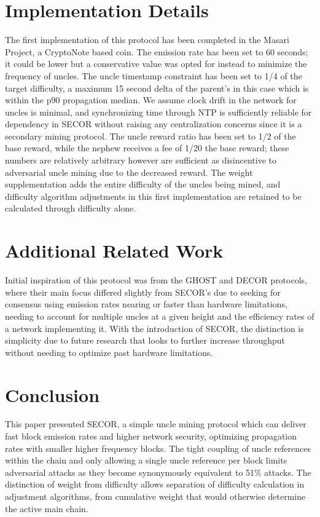 \documentclass{article}
\begin{document}
\section{Implementation Details}
The first implementation of this protocol has been completed in the Masari Project, a CryptoNote based coin. The emission rate has been set to 60 seconds; it could be lower but a conservative value was opted for instead to minimize the frequency of uncles. The uncle timestamp constraint has been set to 1/4 of the target difficulty, a maximum 15 second delta of the parent's in this case which is within the p90 propagation median. We assume clock drift in the network for uncles is minimal, and synchronizing time through NTP is sufficiently reliable for dependency in SECOR without raising any centralization concerns since it is a secondary mining protocol. The uncle reward ratio has been set to 1/2 of the base reward, while the nephew receives a fee of 1/20 the base reward; these numbers are relatively arbitrary however are sufficient as disincentive to adversarial uncle mining due to the decreased reward. The weight supplementation adds the entire difficulty of the uncles being mined, and difficulty algorithm adjustments in this first implementation are retained to be calculated through difficulty alone.

\section{Additional Related Work}
Initial inspiration of this protocol was from the GHOST and DECOR protocols, where their main focus differed slightly from SECOR's due to seeking for consensus using emission rates nearing or faster than hardware limitations, needing to account for multiple uncles at a given height and the efficiency rates of a network implementing it\cite{sompolinsky}\cite{sdlerner}\cite{ethereum}. With the introduction of SECOR, the distinction is simplicity due to future research that looks to further increase throughput without needing to optimize past hardware limitations.

\section{Conclusion}
This paper presented SECOR, a simple uncle mining protocol which can deliver fast block emission rates and higher network security, optimizing propagation rates with smaller higher frequency blocks. The tight coupling of uncle references within the chain and only allowing a single uncle reference per block limits adversarial attacks as they become synonymously equivalent to 51\% attacks. The distinction of weight from difficulty allows separation of difficulty calculation in adjustment algorithms, from cumulative weight that would otherwise determine the active main chain.
\end{document}
